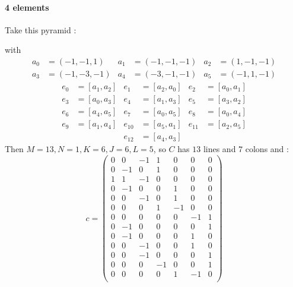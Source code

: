 \paragraph{4 elements}
Take this pyramid :
\begin{figure}[H]
\centering
{}
\end{figure}
with
\begin{align*}
a_0 &= (-1,-1,1) & a_1 &= (-1,-1,-1) & a_2 &= (1,-1,-1)\\
a_3 &= (-1,-3,-1) & a_4 &= (-3,-1,-1) & a_5 &= (-1,1,-1)
\end{align*}
\begin{align*}
e_0 &= [a_1,a_2] & e_1 &= [a_2,a_0] & e_2 &= [a_0,a_1]\\
e_3 &= [a_0,a_3] & e_4 &= [a_1,a_3] & e_5 &= [a_3,a_2]\\
e_6 &= [a_4,a_5] & e_7 &= [a_0,a_5] & e_8 &= [a_0,a_4]\\
e_9 &= [a_1,a_4] & e_{10} &= [a_5,a_1] & e_{11} &= [a_2,a_5]\\
& & e_{12} &= [a_4,a_3] & &
\end{align*}
Then $M=13,N=1,K=6,J=6,L=5$, so $C$ has $13$ lines and $7$ colons and :
\[
c=\begin{pmatrix}
0 & 0 & -1 & 1 & 0 & 0 & 0 \\
 0 & -1 & 0 & 1 & 0 & 0 & 0 \\
 1 & 1 & -1 & 0 & 0 & 0 & 0 \\
 0 & -1 & 0 & 0 & 1 & 0 & 0 \\
 0 & 0 & -1 & 0 & 1 & 0 & 0 \\
 0 & 0 & 0 & 1 & -1 & 0 & 0 \\
 0 & 0 & 0 & 0 & 0 & -1 & 1 \\
 0 & -1 & 0 & 0 & 0 & 0 & 1 \\
 0 & -1 & 0 & 0 & 0 & 1 & 0 \\
 0 & 0 & -1 & 0 & 0 & 1 & 0 \\
 0 & 0 & -1 & 0 & 0 & 0 & 1 \\
 0 & 0 & 0 & -1 & 0 & 0 & 1 \\
 0 & 0 & 0 & 0 & 1 & -1 & 0 \\
 \end{pmatrix}\]
